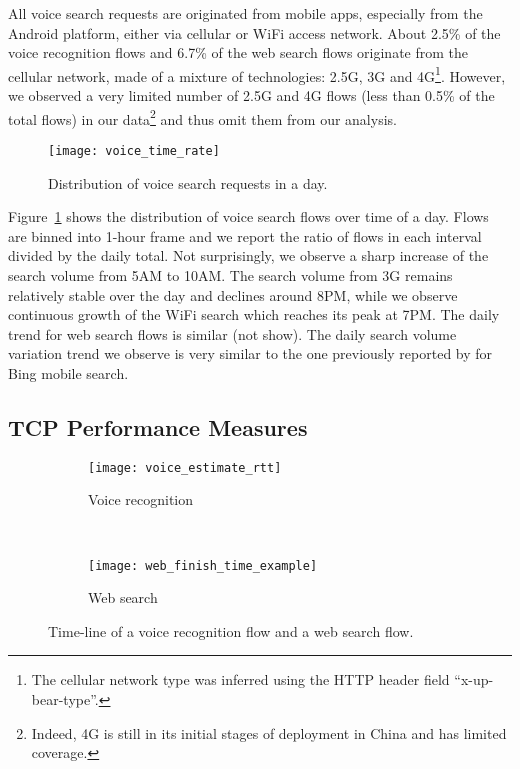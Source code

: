 All voice search requests are originated from mobile apps, especially from the Android platform, either via cellular or WiFi access network. About 2.5\% of the voice recognition flows and 6.7\% of the web search flows originate from the cellular network, made of a mixture of technologies: 2.5G, 3G and 4G\footnote{The cellular network type was inferred using the HTTP header field ``x-up-bear-type''.}. However, we observed a very limited number of 2.5G and 4G flows (less than 0.5\% of the total flows) in our data\footnote{Indeed, 4G is still in its initial stages of deployment in China and has limited coverage.} and thus omit them from our analysis.

\begin{figure}[t]
\centering
\texttt{[image: voice\_time\_rate]}
\caption{Distribution of voice search requests in a day.}
\label{fig:voice_time_rate}
\end{figure}

Figure~\ref{fig:voice_time_rate} shows the distribution of voice search flows over time of a day. Flows are binned into 1-hour frame and we report the ratio of flows in each interval divided by the daily total. Not surprisingly, we observe a sharp increase of the search volume from 5AM to 10AM. The search volume from 3G remains relatively stable over the day and declines around 8PM, while we observe continuous growth of the WiFi search which reaches its peak at 7PM. The daily trend for web search flows is similar (not show). The daily search volume variation trend we observe is very similar to the one previously reported by \cite{Song:2013:EEU:2488388.2488493} for Bing mobile search.

\subsection{TCP Performance Measures}

\begin{figure}[ht]
\centering
\begin{subfigure}[b]{0.6\linewidth}
	\texttt{[image: voice\_estimate\_rtt]}
\caption{Voice recognition}
\label{fig:voice_estimate_rtt}
\end{subfigure} \\
\begin{subfigure}[b]{0.6\linewidth}
	\texttt{[image: web\_finish\_time\_example]}
\caption{Web search}
\label{fig:web_finish_time_example}
\end{subfigure}
\caption{Time-line of a voice recognition flow and a web search flow.}
\label{fig:time_line}
\end{figure}


